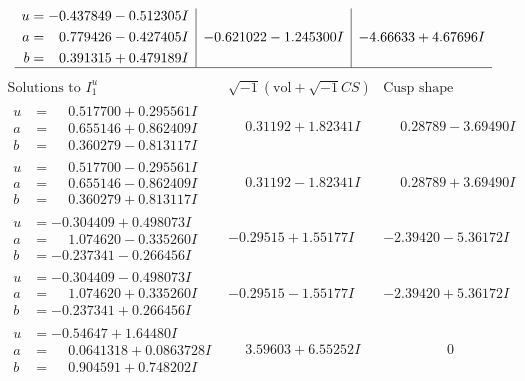 \documentclass[1p]{elsarticle_modified}
\theoremstyle{definition}
\newcommand{\I}{\sqrt{-1}}
\begin{document}
$$\begin{array}{c|c|c}
\begin{aligned}
u &= -0.437849 - 0.512305 I \\
a &= \phantom{-}0.779426 - 0.427405 I \\
b &= \phantom{-}0.391315 + 0.479189 I\end{aligned}
 & -0.621022 - 1.245300 I & -4.66633 + 4.67696 I\\
 \hline 
 \end{array}$$\newpage$$\begin{array}{c|c|c}  
\text{Solutions to }I^u_{1}& \I (\text{vol} + \sqrt{-1}CS) & \text{Cusp shape}\\
 \hline 
\begin{aligned}
u &= \phantom{-}0.517700 + 0.295561 I \\
a &= \phantom{-}0.655146 + 0.862409 I \\
b &= \phantom{-}0.360279 - 0.813117 I\end{aligned}
 & \phantom{-}0.31192 + 1.82341 I & \phantom{-}0.28789 - 3.69490 I \\ \hline\begin{aligned}
u &= \phantom{-}0.517700 - 0.295561 I \\
a &= \phantom{-}0.655146 - 0.862409 I \\
b &= \phantom{-}0.360279 + 0.813117 I\end{aligned}
 & \phantom{-}0.31192 - 1.82341 I & \phantom{-}0.28789 + 3.69490 I \\ \hline\begin{aligned}
u &= -0.304409 + 0.498073 I \\
a &= \phantom{-}1.074620 - 0.335260 I \\
b &= -0.237341 - 0.266456 I\end{aligned}
 & -0.29515 + 1.55177 I & -2.39420 - 5.36172 I \\ \hline\begin{aligned}
u &= -0.304409 - 0.498073 I \\
a &= \phantom{-}1.074620 + 0.335260 I \\
b &= -0.237341 + 0.266456 I\end{aligned}
 & -0.29515 - 1.55177 I & -2.39420 + 5.36172 I \\ \hline\begin{aligned}
u &= -0.54647 + 1.64480 I \\
a &= \phantom{-}0.0641318 + 0.0863728 I \\
b &= \phantom{-}0.904591 + 0.748202 I\end{aligned}
 & \phantom{-}3.59603 + 6.55252 I & \phantom{-0.000000 } 0 \\ \hline\begin{aligned}

\end{aligned}
\end{array}$$
\end{document}
